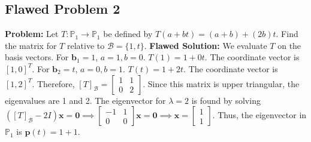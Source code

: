 \documentclass[11pt, a4paper]{article}
\theoremstyle{definition}
\theoremstyle{remark}
\begin{document}
\subsection{Flawed Problem 2}
\textbf{Problem:} Let $T: \mathbb{P}_1 \to \mathbb{P}_1$ be defined by $T(a + bt) = (a+b) + (2b)t$. Find the matrix for $T$ relative to $\mathcal{B} = \{1, t\}$.
\textbf{Flawed Solution:}
We evaluate $T$ on the basis vectors.
For $\mathbf{b}_1 = 1$, $a=1, b=0$. $T(1) = 1 + 0t$. The coordinate vector is $[1, 0]^T$.
For $\mathbf{b}_2 = t$, $a=0, b=1$. $T(t) = 1 + 2t$. The coordinate vector is $[1, 2]^T$.
Therefore, $[T]_\mathcal{B} = \begin{bmatrix} 1 & 1 \\ 0 & 2 \end{bmatrix}$.
Since this matrix is upper triangular, the eigenvalues are 1 and 2. The eigenvector for $\lambda=2$ is found by solving $([T]_\mathcal{B} - 2I)\mathbf{x} = \mathbf{0} \implies \begin{bmatrix} -1 & 1 \\ 0 & 0 \end{bmatrix}\mathbf{x} = \mathbf{0} \implies \mathbf{x} = \begin{bmatrix} 1 \\ 1 \end{bmatrix}$.
Thus, the eigenvector in $\mathbb{P}_1$ is $\mathbf{p}(t) = 1 + 1$.
\end{document}
